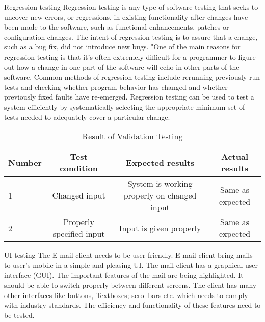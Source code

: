 Regression testing 
         Regression testing is any type of software testing that seeks to uncover new errors, or regressions, in existing functionality after changes have been made to the software, such as functional enhancements, patches or configuration changes.
        The intent of regression testing is to assure that a change, such as a bug fix, did not introduce new bugs. "One of the main reasons for regression testing is that it's often extremely difficult for a programmer to figure out how a change in one part of the software will echo in other parts of the software.
       Common methods of regression testing include rerunning previously run tests and checking whether program behavior has changed and whether previously fixed faults have re-emerged. Regression testing can be used to test a system efficiently by systematically selecting the appropriate minimum set of tests needed to adequately cover a particular change.


\begin{table}[h]

\centering
\begin{tabular}{|l|c|c|c|} \hline 
Number & Test condition & Expected results & Actual results\\
\hline
1 & Changed input  & System is working properly on changed input & Same as expected\\
\hline
2 & Properly specified input & Input is given properly & Same as expected\\
\hline

\end{tabular} 
\caption{Result of Validation Testing}

\end{table}


 UI testing
	The E-mail client needs to be user friendly. E-mail client bring mails to user’s mobile in a simple and pleasing UI. The mail client has a graphical user interface (GUI). The important features of the mail are being highlighted. It should be able to switch properly between different screens. The client has many other interfaces like buttons, Textboxes; scrollbars etc. which needs to comply with industry standards. The efficiency and functionality of these features need to be tested.

